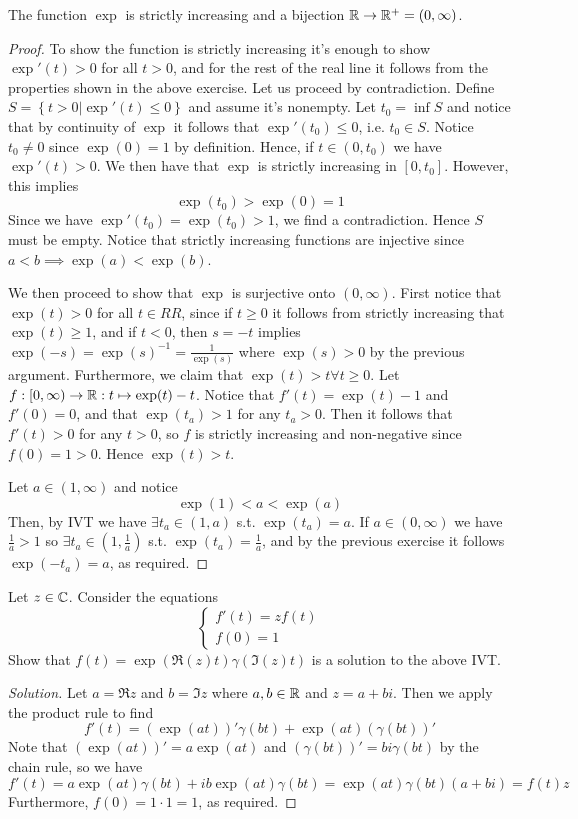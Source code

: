 \begin{proposition}
  The function $\exp$ is strictly increasing and a bijection $\mathbb R\to\mathbb R^{+}=(0,\infty)$.
  \label{prop:expStricIncrease}
\end{proposition}
\begin{proof}
  To show the function is strictly increasing it's enough to show $\exp'(t)>0$ for all
  $t>0$, and for the rest of the real line it follows from the properties shown in the
  above exercise. Let us proceed by contradiction. Define $S=\left\{ t>0 | \exp'(t)\leq 0
  \right\}$ and assume it's nonempty. Let $t_0=\inf S$ and notice that by continuity of
  $\exp$ it follows that $\exp'(t_0)\leq 0$, i.e. $t_0\in S$. Notice $t_0\neq 0$ since
  $\exp(0)=1$ by definition. Hence, if $t\in(0,t_0)$ we have $\exp'(t)>0$. We then have
  that $\exp$ is strictly increasing in $[0,t_0]$. However, this implies 
  \[\exp(t_0)>\exp(0)=1\]
  Since we have $\exp'(t_0)=\exp(t_0)>1$, we find a contradiction. Hence $S$ must be empty.
  Notice that strictly increasing functions are injective since $a<b\implies
  \exp(a)<\exp(b)$.

  We then proceed to show that $\exp$ is surjective onto $(0,\infty)$. First notice that
  $\exp(t)> 0$ for all $t\in RR$, since if $t\geq 0$ it follows from strictly increasing
  that $\exp(t)\geq 1$, and if $t<0$, then $s=-t$ implies
  $\exp(-s)=\exp(s)^{-1}=\frac{1}{\exp(s)}$ where $\exp(s)>0$ by the previous argument.
  Furthermore, we claim that $\exp(t)>t\forall t\geq 0$. Let $f:[0,\infty) \to\mathbb R:t\mapsto
  \exp(t)-t$. Notice that $f'(t)=\exp(t)-1$ and $f'(0)=0$, and that $\exp(t_a)>1$ for any
  $t_a>0$. Then it follows that $f'(t)>0$ for any $t>0$, so $f$ is strictly increasing and
  non-negative since $f(0)=1>0$. Hence $\exp(t)>t$.

  Let $a\in(1,\infty)$ and notice 
  \[\exp(1)<a<\exp(a)\]
  Then, by IVT we have $\exists t_a \in(1,a)$ s.t. $\exp(t_a)=a$. If $a\in(0,\infty)$ we
  have $\frac{1}{a}>1$ so $\exists t_a\in(1,\frac{1}{a})$ s.t.
  $\exp(t_a)=\frac{1}{a}$, and by the previous exercise it follows $\exp(-t_a)=a$, as
  required. 
\end{proof}


\begin{exercise}
  Let $z\in\mathbb C$. Consider the equations 
  \[\begin{cases}
      f'(t)=zf(t)\\
      f(0)=1
    \end{cases}
  \]
  Show that $f(t)=\exp(\Re(z) t)\gamma (\Im(z)t)$ is a solution to the above IVT.
\end{exercise}
\begin{proof}[Solution]
  Let $a=\Re z$ and $b=\Im z$ where $a,b\in\mathbb R$ and $z=a+bi$. Then we apply the product
  rule to find
  \[f'(t)= (\exp(at))'\gamma(bt) + \exp(at)(\gamma(bt))'\]
  Note that $(\exp(at))'=a\exp(at)$ and $(\gamma(bt))'=bi\gamma(bt)$ by the chain rule, so
  we have  
  \[f'(t)=a\exp(at)\gamma(bt) + ib\exp(at)\gamma(bt) = \exp(at)\gamma(bt)(a+bi)= f(t)z\]
  Furthermore, $f(0)=1\cdot 1=1$, as required.
\end{proof}

